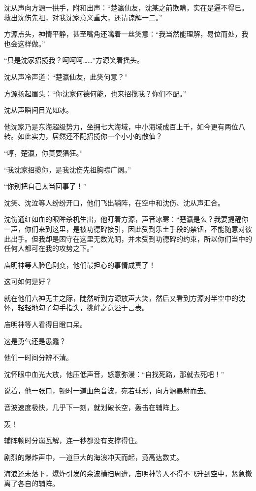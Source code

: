 \begin{this_body}
沈从声向方源一拱手，附和出声：“楚瀛仙友，沈某之前欺瞒，实在是逼不得已。救出沈伤先祖，对我沈家意义重大，还请谅解一二。”

方源点头，神情平静，甚至嘴角还噙着一丝笑意：“我当然能理解，易位而处，我也会这样做。”

“只是沈家招揽我？呵呵呵……”方源笑着摇头。

沈从声冷声道：“楚瀛仙友，此笑何意？”

方源扬起眉头：“你沈家何德何能，也来招揽我？你们不配。”

沈从声瞬间目光如冰。

他沈家乃是东海超级势力，坐拥七大海域，中小海域成百上千，如今更有两位八转。如此实力，居然还不配招揽你一个小小的散仙？

“哼，楚瀛，你莫要猖狂。”

“我沈家招揽你，是我沈伤先祖胸襟广阔。”

“你别把自己太当回事了！”

沈笑、沈泣等人纷纷开口，他们飞出辅阵，在空中和沈伤、沈从声汇合。

沈伤通红如血的眼眸杀机生出，他盯着方源，声音冰寒：“楚瀛是么？我要提醒你一声，你们来到这里，是被功德碑接引，因此受到乐土手段的禁锢，不能随意对彼此出手。但我却是困守在这里无数光阴，并未受到功德碑的约束，所以你们当中的任何人都可在我的攻势之下。”

庙明神等人脸色剧变，他们最担心的事情成真了！

这可如何是好？

就在他们六神无主之际，陡然听到方源放声大笑，然后又看到方源对半空中的沈怀，轻轻地勾了勾手指头，挑衅之意溢于言表。

庙明神等人看得目瞪口呆。

这是勇气还是愚蠢？

他们一时间分辨不清。

沈怀眼中血光大放，他压低声音，怒意弥漫：“自找死路，那就去死吧！”

说着，他一张口，顿时一道血色音波，宛若球形，向方源暴射而去。

音波速度极快，几乎下一刻，就划破长空，轰击在辅阵上。

轰！

辅阵顿时分崩瓦解，连一秒都没有支撑得住。

剧烈的爆炸声中，一道巨大的海浪冲天而起，竟高达数丈。

海浪还未落下，爆炸引发的余波横扫周遭，庙明神等人不得不飞升到空中，紧急撤离了各自的辅阵。


\end{this_body}
